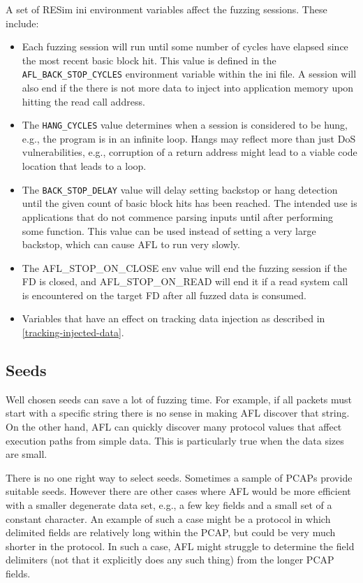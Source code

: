 \documentclass[titlepage]{article}
\begin{document}
A set of RESim ini environment variables affect the fuzzing sessions.  These include:
\begin{itemize}
\item Each fuzzing session will run until some number of cycles have elapsed since the most recent basic block hit.  This
value is defined in the {\tt AFL\_BACK\_STOP\_CYCLES} environment variable within the ini file.  A session will also end
if the there is not more data to inject into application memory upon hitting the read call address.

\item The {\tt HANG\_CYCLES} value determines when a session is considered to be hung, e.g., the program is in an infinite loop.
Hangs may reflect more than just DoS vulnerabilities, e.g., corruption of a return address might lead to a viable code location
that leads to a loop.

\item The {\tt BACK\_STOP\_DELAY} value will delay setting backstop or hang detection until the given count of basic block hits has been reached.
The intended use is applications that do not commence parsing inputs until after performing some function.  This value can be used instead of setting a very
large backstop, which can cause AFL to run very slowly.

\item The AFL\_STOP\_ON\_CLOSE env value will end the fuzzing session if the FD is closed, and AFL\_STOP\_ON\_READ will end it if
a read system call is encountered on the target FD after all fuzzed data is consumed.

\item Variables that have an effect on tracking data injection as described in \ref{tracking-injected-data}.
\end{itemize}

\subsection{Seeds}
Well chosen seeds can save a lot of fuzzing time.  For example, if all packets must start with a specific string there is no sense in
making AFL discover that string.  On the other hand, AFL can quickly discover many protocol values that affect execution paths from simple
data.  This is particularly true when the data sizes are small.  

There is no one right way to select seeds.  Sometimes a sample of PCAPs provide suitable seeds.  However there are other cases where AFL would
be more efficient with a smaller degenerate data set, e.g., a few key fields and a small set of a constant character.  An example of such a case
might be a protocol in which delimited fields are relatively long within the PCAP, but could be very much shorter in the protocol.  In such a case,
AFL might struggle to determine the field delimiters (not that it explicitly does any such thing) from the longer PCAP fields.
\end{document}
